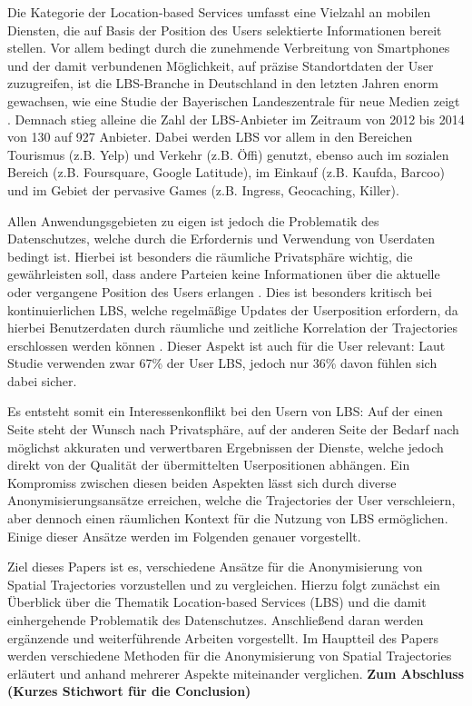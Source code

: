 Die Kategorie der Location-based Services umfasst eine Vielzahl an mobilen Diensten, die auf Basis der Position des Users selektierte Informationen bereit stellen. Vor allem bedingt durch die zunehmende Verbreitung von Smartphones und der damit verbundenen Möglichkeit, auf präzise Standortdaten der User zuzugreifen, ist die LBS-Branche in Deutschland in den letzten Jahren enorm gewachsen, wie eine Studie der Bayerischen Landeszentrale für neue Medien zeigt \cite{Consulting2014}. Demnach stieg alleine die Zahl der LBS-Anbieter im Zeitraum von 2012 bis 2014 von 130 auf 927 Anbieter. Dabei werden LBS vor allem in den Bereichen Tourismus (z.B. Yelp) und Verkehr (z.B. Öffi) genutzt, ebenso auch im sozialen Bereich (z.B. Foursquare, Google Latitude), im Einkauf (z.B. Kaufda, Barcoo) und im Gebiet der pervasive Games (z.B. Ingress, Geocaching, Killer).

Allen Anwendungsgebieten zu eigen ist jedoch die Problematik des Datenschutzes, welche durch die Erfordernis und Verwendung von Userdaten bedingt ist. Hierbei ist besonders die räumliche Privatsphäre wichtig, die gewährleisten soll, dass andere Parteien keine Informationen über die aktuelle oder vergangene Position des Users erlangen \cite{Beresford2003}. Dies ist besonders kritisch bei kontinuierlichen LBS, welche regelmäßige Updates der Userposition erfordern, da hierbei Benutzerdaten durch räumliche und zeitliche Korrelation der Trajectories erschlossen werden können \cite{Chow2011}. Dieser Aspekt ist auch für die User relevant: Laut Studie verwenden zwar 67\% der User LBS, jedoch nur 36\% davon fühlen sich dabei sicher.

Es entsteht somit ein Interessenkonflikt bei den Usern von LBS: Auf der einen Seite steht der Wunsch nach Privatsphäre, auf der anderen Seite der Bedarf nach möglichst akkuraten und verwertbaren Ergebnissen der Dienste, welche jedoch direkt von der Qualität der übermittelten Userpositionen abhängen. Ein Kompromiss zwischen diesen beiden Aspekten lässt sich durch diverse Anonymisierungsansätze erreichen, welche die Trajectories der User verschleiern, aber dennoch einen räumlichen Kontext für die Nutzung von LBS ermöglichen. Einige dieser Ansätze werden im Folgenden genauer vorgestellt.

Ziel dieses Papers ist es, verschiedene Ansätze für die Anonymisierung von Spatial Trajectories vorzustellen und zu vergleichen. Hierzu folgt zunächst ein Überblick über die Thematik Location-based Services (LBS) und die damit einhergehende Problematik des Datenschutzes. Anschließend daran werden ergänzende und weiterführende Arbeiten vorgestellt. Im Hauptteil des Papers werden verschiedene Methoden für die Anonymisierung von Spatial Trajectories erläutert und anhand mehrerer Aspekte miteinander verglichen. \textbf{Zum Abschluss (Kurzes Stichwort für die Conclusion)}